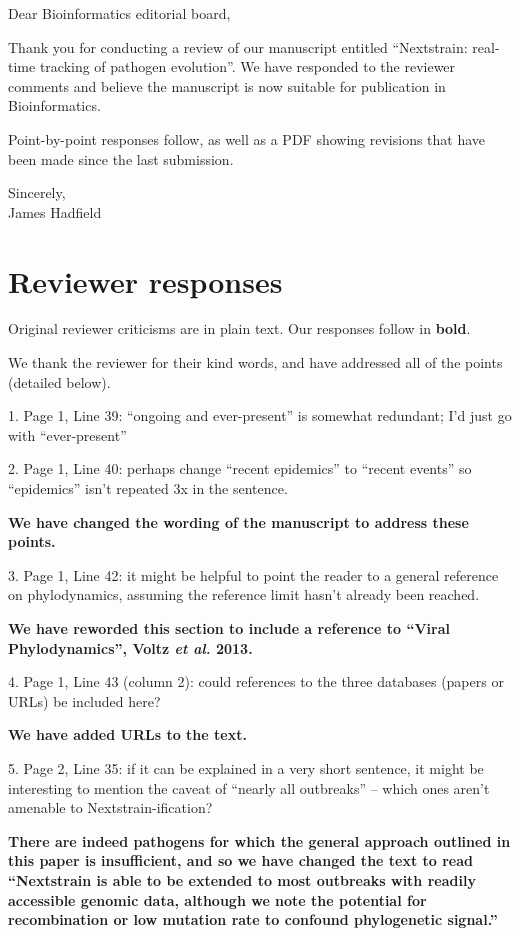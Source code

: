 \documentclass[11pt,oneside,letterpaper]{article}
\begin{document}

Dear Bioinformatics editorial board,

Thank you for conducting a review of our manuscript entitled ``Nextstrain: real-time tracking of pathogen evolution''.  We have responded to the reviewer comments and believe the manuscript is now suitable for publication in Bioinformatics.

Point-by-point responses follow, as well as a PDF showing revisions that have been made since the last submission.

Sincerely,\\
James Hadfield

\restoregeometry

\newpage

\section*{Reviewer responses}

Original reviewer criticisms are in plain text.  Our responses follow in \textbf{bold}.

We thank the reviewer for their kind words, and have addressed all of the points (detailed below).

1. Page 1, Line 39: ``ongoing and ever-present'' is somewhat redundant; I'd just go with ``ever-present''

2. Page 1, Line 40: perhaps change ``recent epidemics'' to ``recent events'' so ``epidemics'' isn't repeated 3x in the sentence.

\textbf{We have changed the wording of the manuscript to address these points.}

3. Page 1, Line 42: it might be helpful to point the reader to a general reference on phylodynamics, assuming the reference limit hasn't already been reached.

\textbf{We have reworded this section to include a reference to ``Viral Phylodynamics'', Voltz \textit{et al.} 2013.}

4. Page 1, Line 43 (column 2): could references to the three databases (papers or URLs) be included here?

\textbf{We have added URLs to the text.}

5. Page 2, Line 35: if it can be explained in a very short sentence, it might be interesting to mention the caveat of ``nearly all outbreaks'' -- which ones aren't amenable to Nextstrain-ification?

\textbf{There are indeed pathogens for which the general approach outlined in this paper is insufficient, and so we have changed the text to read ``Nextstrain is able to be extended to most outbreaks with readily accessible genomic data, although we note the potential for recombination or low mutation rate to confound phylogenetic signal.''}
\end{document}
